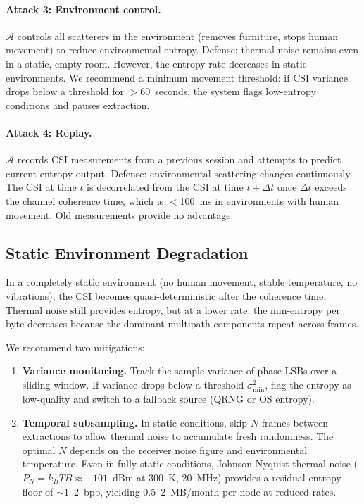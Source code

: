 \paragraph{Attack 3: Environment control.}
$\mathcal{A}$ controls all scatterers in the environment (removes furniture, stops human movement) to reduce environmental entropy.
Defense: thermal noise remains even in a static, empty room.
However, the entropy rate decreases in static environments.
We recommend a minimum movement threshold: if CSI variance drops below a threshold for $>$60~seconds, the system flags low-entropy conditions and pauses extraction.

\paragraph{Attack 4: Replay.}
$\mathcal{A}$ records CSI measurements from a previous session and attempts to predict current entropy output.
Defense: environmental scattering changes continuously.
The CSI at time $t$ is decorrelated from the CSI at time $t + \Delta t$ once $\Delta t$ exceeds the channel coherence time, which is $<$100~ms in environments with human movement.
Old measurements provide no advantage.

\subsection{Static Environment Degradation}
\label{subsec:static}

In a completely static environment (no human movement, stable temperature, no vibrations), the CSI becomes quasi-deterministic after the coherence time.
Thermal noise still provides entropy, but at a lower rate: the min-entropy per byte decreases because the dominant multipath components repeat across frames.

We recommend two mitigations:
\begin{enumerate}
\item \textbf{Variance monitoring.} Track the sample variance of phase LSBs over a sliding window. If variance drops below a threshold $\sigma_{\min}^2$, flag the entropy as low-quality and switch to a fallback source (QRNG or OS entropy).
\item \textbf{Temporal subsampling.} In static conditions, skip $N$ frames between extractions to allow thermal noise to accumulate fresh randomness. The optimal $N$ depends on the receiver noise figure and environmental temperature.
Even in fully static conditions, Johnson-Nyquist thermal noise ($P_N = k_B T B \approx -101$~dBm at 300~K, 20~MHz) provides a residual entropy floor of $\sim$1--2~bpb, yielding 0.5--2~MB/month per node at reduced rates.
\end{enumerate}

